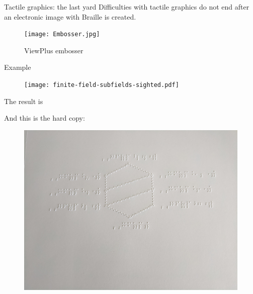 \begin{frame}{Tactile graphics: the last yard}
\protect\hypertarget{tactile-graphics-the-last-yard}{}
Difficulties with tactile graphics do not end after an electronic image
with Braille is created. 


\begin{figure}
\centering
\texttt{[image: Embosser.jpg]}
\caption{ViewPlus embosser}
\end{figure}
\end{frame}

\begin{frame}{Example}

\begin{figure}
\centering
\texttt{[image: finite-field-subfields-sighted.pdf]}
\end{figure}

\end{frame}

\begin{frame}
The result is 

\begin{figure}
\centering
{}
\end{figure}

\end{frame}


\begin{frame}
And this is the hard copy:

\begin{figure}
\centering
\includegraphics{diagram_bad.jpg}
\end{figure}
\end{frame}

